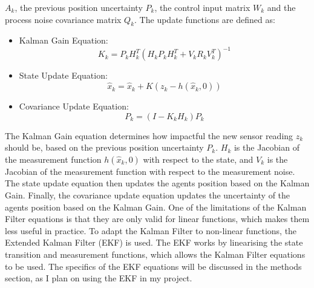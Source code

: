 \documentclass[12pt]{article}
\begin{document}
\(A_{k}\), the previous position uncertainty \(P_{k}\), the control input matrix \(W_{k}\) and the process noise covariance
matrix \(Q_{k}\). The update functions are defined as:
\begin{itemize}
    \item Kalman Gain Equation:
    \begin{equation}
        K_k = P_{k} H_k^T (H_k P_{k} H_k^T + V_k R_k V_k^T)^{-1}
    \end{equation}
    \item State Update Equation:
    \begin{equation}
        \hat{x}_{k} = \hat{x}_{k} + K(z_k - h(\hat{x}_{k}, 0))
    \end{equation}
    \item Covariance Update Equation:
    \begin{equation}
        P_{k} = (I - K_k H_k) P_k
    \end{equation}
\end{itemize}
The Kalman Gain equation determines how impactful the new sensor reading \(z_k\) should be, based on the previous position
uncertainty \(P_{k}\). \(H_k\) is the Jacobian of the measurement function \(h(\hat{x}_{k}, 0)\) with respect to the state, and \(V_k\) is the Jacobian of the measurement function with respect to the measurement noise. The state update
equation then updates the agents position based on the Kalman Gain. Finally, the covariance update equation updates the uncertainty of the agents position based on the Kalman Gain.
One of the limitations of the Kalman Filter equations is that they are only valid for linear functions, which makes them less useful in practice. To adapt the Kalman Filter to
non-linear functions, the Extended Kalman Filter (EKF) is used. The EKF works by linearising the state transition and measurement functions, which allows the Kalman Filter equations
to be used. The specifics of the EKF equations will be discussed in the methods section, as I plan on using the EKF in my project.\\
\end{document}
